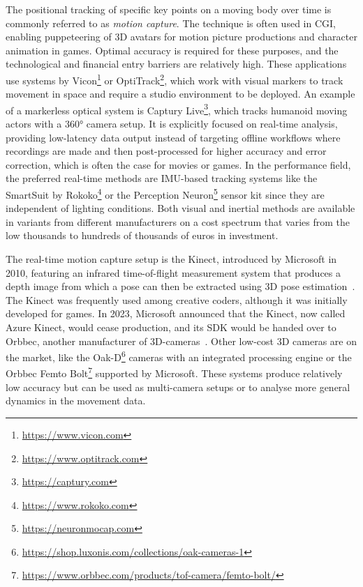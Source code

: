 The positional tracking of specific key points on a moving body over time is commonly referred to as \emph{motion capture}.
The technique is often used in \ac{CGI}, enabling puppeteering of \ac{3D} avatars for motion picture productions and character animation in games.
Optimal accuracy is required for these purposes, and the technological and financial entry barriers are relatively high.
These applications use systems by Vicon\footnote{\url{https://www.vicon.com}} or OptiTrack\footnote{\url{https://www.optitrack.com}}, which work with visual markers to track movement in space and require a studio environment to be deployed.
An example of a markerless optical system is Captury Live\footnote{\url{https://captury.com}}, which tracks humanoid moving actors with a 360° camera setup.
It is explicitly focused on real-time analysis, providing low-latency data output instead of targeting offline workflows where recordings are made and then post-processed for higher accuracy and error correction, which is often the case for movies or games.
In the performance field, the preferred real-time methods are \ac{IMU}-based tracking systems like the SmartSuit by Rokoko\footnote{\url{https://www.rokoko.com}} or the Perception Neuron\footnote{\url{https://neuronmocap.com}} sensor kit since they are independent of lighting conditions.
Both visual and inertial methods are available in variants from different manufacturers on a cost spectrum that varies from the low thousands to hundreds of thousands of euros in investment.

The  real-time motion capture setup is the Kinect, introduced by Microsoft in 2010, featuring an infrared time-of-flight measurement system that produces a depth image from which a pose can then be extracted using \ac{3D} pose estimation~\parencite[see][]{poseEstimationPaper}.
The Kinect was frequently used among creative coders, although it was initially developed for games.
In 2023, Microsoft announced that the Kinect, now called Azure Kinect, would cease production, and its \ac{SDK} would be handed over to Orbbec, another manufacturer of \ac{3D}-cameras~\parencite{kinectDiscontinued}.
Other low-cost 3D cameras are on the market, like the Oak-D\footnote{\url{https://shop.luxonis.com/collections/oak-cameras-1}} cameras with an integrated processing engine or the Orbbec Femto Bolt\footnote{\url{https://www.orbbec.com/products/tof-camera/femto-bolt/}} supported by Microsoft.
These systems produce relatively low accuracy but can be used as multi-camera setups or to analyse more general dynamics in the movement data.

